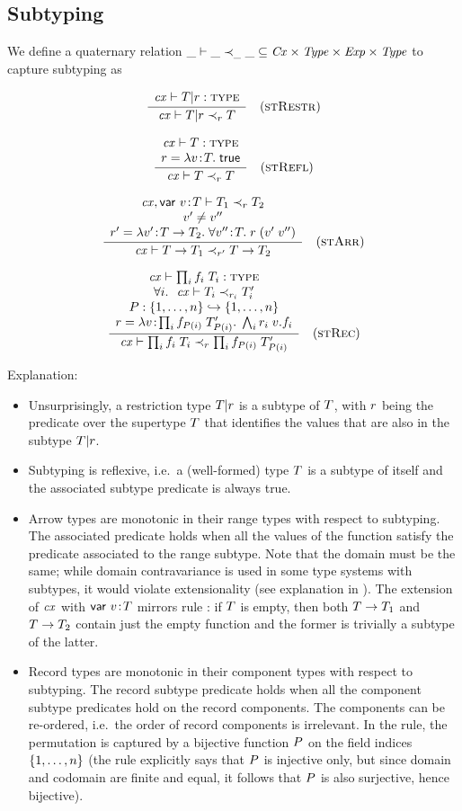 \subsection{Subtyping}

We define a quaternary relation $\_\vdash\_\prec_{\_}\_\subseteq\mathit{Cx}\times\mathit{Type}\times\mathit{Exp}\times\mathit{Type}$ to
capture subtyping as

\[
\frac{\begin{array}{c}\mathit{cx}\vdash T|r:\textsc{type}\end{array}}{\mathit{cx}\vdash T|r\prec_{r}T}\quad\mbox{(\textsc{stRestr})}
\]

\[
\frac{\begin{array}{c}\mathit{cx}\vdash T:\textsc{type}\\r=\lambda v\!:\!T.\;\mathsf{true}\end{array}}{\mathit{cx}\vdash T\prec_{r}T}\quad\mbox{(\textsc{stRefl})}
\]

\[
\frac{\begin{array}{c}\mathit{cx},\mathsf{var}\ v\!:\!T\vdash T_1\prec_{r}T_2\\v'\neq v''\\r'=\lambda v'\!:\!T\to T_2.\;\forall v''\!:\!T.\;r\;(v'\;v'')\end{array}}{\mathit{cx}\vdash T\to T_1\prec_{r'}T\to T_2}\quad\mbox{(\textsc{stArr})}
\]

\[
\frac{\begin{array}{c}\mathit{cx}\vdash\prod_{i}f_i\;T_i:\textsc{type}\\\forall i.\ \ \mathit{cx}\vdash T_i\prec_{r_i}T_i'\\P:\{1,\ldots,n\}\hookrightarrow\{1,\ldots,n\}\\r=\lambda v\!:\!\prod_{i}f_{P(i)}\;T_{P(i)}'.\;\bigwedge_{i}r_i\;v.f_i\end{array}}{\mathit{cx}\vdash\prod_{i}f_i\;T_i\prec_{r}\prod_{i}f_{P(i)}\;T_{P(i)}'}\quad\mbox{(\textsc{stRec})}
\]

Explanation:
\begin{itemize}
\item
Unsurprisingly, a restriction type $T|r$ is a subtype of $T$, with
$r$ being the predicate over the supertype $T$ that identifies the
values that are also in the subtype $T|r$.
\item
Subtyping is reflexive, i.e.\ a (well-formed) type $T$ is a subtype of
itself and the associated subtype predicate is always true.
\item
Arrow types are monotonic in their range types with respect to subtyping. The
associated predicate holds when all the values of the function satisfy the
predicate associated to the range subtype. Note that the domain must be the
same; while domain contravariance is used in some type systems with subtypes,
it would violate extensionality (see explanation in \cite{pvs-seman}). The
extension of $\mathit{cx}$ with $\mathsf{var}\ v\!:\!T$ mirrors rule \Rtarr: if $T$ is empty, then
both $T\to T_1$ and $T\to T_2$ contain just the empty
function and the former is trivially a subtype of the latter.
\item
Record types are monotonic in their component types with respect to
subtyping. The record subtype predicate holds when all the component subtype
predicates hold on the record components. The components can be re-ordered,
i.e.\ the order of record components is irrelevant. In the rule, the
permutation is captured by a bijective function $P$ on the field indices
$\{1,\ldots,n\}$ (the rule explicitly says that $P$ is injective only, but
since domain and codomain are finite and equal, it follows that $P$ is
also surjective, hence bijective).
\end{itemize}

